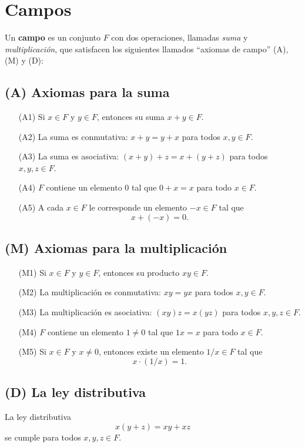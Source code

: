 \documentclass[12pt]{article}
\begin{document}
\section*{Campos}

\begin{definition}

Un \textbf{campo} es un conjunto \( F \) con dos operaciones, llamadas \textit{suma} y \textit{multiplicación}, que satisfacen los siguientes llamados “axiomas de campo” (A), (M) y (D):

\subsection*{(A) Axiomas para la suma}
\begin{itemize}
  \item[(A1)] Si \( x \in F \) y \( y \in F \), entonces su suma \( x + y \in F \).
  \item[(A2)] La suma es conmutativa: \( x + y = y + x \) para todos \( x, y \in F \).
  \item[(A3)] La suma es asociativa: \( (x + y) + z = x + (y + z) \) para todos \( x, y, z \in F \).
  \item[(A4)] \( F \) contiene un elemento \( 0 \) tal que \( 0 + x = x \) para todo \( x \in F \).
  \item[(A5)] A cada \( x \in F \) le corresponde un elemento \( -x \in F \) tal que
  \[
  x + (-x) = 0.
  \]
\end{itemize}

\subsection*{(M) Axiomas para la multiplicación}
\begin{itemize}
  \item[(M1)] Si \( x \in F \) y \( y \in F \), entonces su producto \( xy \in F \).
  \item[(M2)] La multiplicación es conmutativa: \( xy = yx \) para todos \( x, y \in F \).
  \item[(M3)] La multiplicación es asociativa: \( (xy)z = x(yz) \) para todos \( x, y, z \in F \).
  \item[(M4)] \( F \) contiene un elemento \( 1 \ne 0 \) tal que \( 1x = x \) para todo \( x \in F \).
  \item[(M5)] Si \( x \in F \) y \( x \ne 0 \), entonces existe un elemento \( 1/x \in F \) tal que
  \[
  x \cdot (1/x) = 1.
  \]
\end{itemize}

\subsection*{(D) La ley distributiva}
La ley distributiva
\[
x(y + z) = xy + xz
\]
se cumple para todos \( x, y, z \in F \).

\end{definition}
\end{document}
